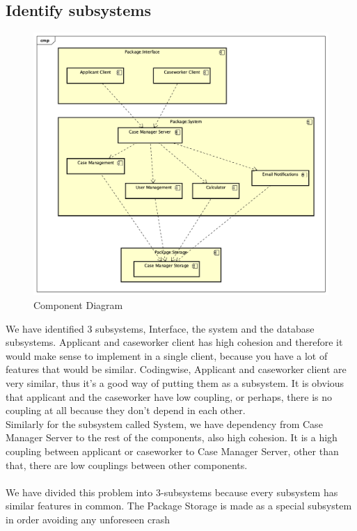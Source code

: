 \newpage
\subsection{Identify subsystems}
\begin{figure}[htb!]
    \centering
    \includegraphics[width=\textwidth]{img/cmp-diagram.png}
    \caption{Component Diagram}
\end{figure}
We have identified 3 subsystems, Interface, the system and the database subsystems.
Applicant and caseworker client has high cohesion and therefore it would make sense to implement in a single client, because you have a lot of features that would be similar. Codingwise, Applicant and caseworker client are very similar, thus it's a good way of putting them as a subsystem. It is obvious that applicant and the caseworker have low coupling, or perhaps, there is no coupling at all because they don't depend in each other. \\
Similarly for the subsystem called System, we have dependency from Case Manager Server to the rest of the components, also high cohesion. 
It is a high coupling between applicant or caseworker to Case Manager Server, other than that, there are  low couplings between other components.\\
\\
We have divided this problem into 3-subsystems because  every subsystem has similar features in common. The Package Storage is made as a special subsystem in order avoiding any unforeseen crash





  